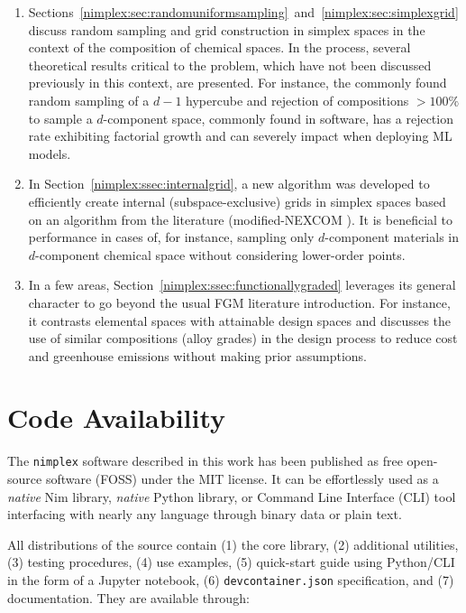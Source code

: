 \begin{enumerate}
    
    \item Sections~\ref{nimplex:sec:randomuniformsampling}~and~\ref{nimplex:sec:simplexgrid} discuss random sampling and grid construction in simplex spaces in the context of the composition of chemical spaces. In the process, several theoretical results critical to the problem, which have not been discussed previously in this context, are presented. For instance, the commonly found random sampling of a $d-1$ hypercube and rejection of compositions $>100\%$ to sample a $d$-component space, commonly found in software, has a rejection rate exhibiting factorial growth and can severely impact when deploying ML models.
    
    \item In Section~\ref{nimplex:ssec:internalgrid}, a new algorithm was developed to efficiently create internal (subspace-exclusive) grids in simplex spaces based on an algorithm from the literature (modified-NEXCOM \cite{Chasalow1995AlgorithmPoints}). It is beneficial to performance in cases of, for instance, sampling only $d$-component materials in $d$-component chemical space without considering lower-order points.

    \item In a few areas, Section~\ref{nimplex:ssec:functionallygraded} leverages its general character to go beyond the usual FGM literature introduction. For instance, it contrasts elemental spaces with attainable design spaces and discusses the use of similar compositions (alloy grades) in the design process to reduce cost and greenhouse emissions without making prior assumptions.
    
\end{enumerate}

\section*{Code Availability}

The \texttt{nimplex} software described in this work has been published as free open-source software (FOSS) under the MIT license. It can be effortlessly used as a \emph{native} Nim library, \emph{native} Python library, or Command Line Interface (CLI) tool interfacing with nearly any language through binary data or plain text.

All distributions of the source contain (1) the core library, (2) additional utilities, (3) testing procedures, (4) use examples, (5) quick-start guide using Python/CLI in the form of a Jupyter notebook, (6) \texttt{devcontainer.json} specification, and (7) documentation. They are available through:

